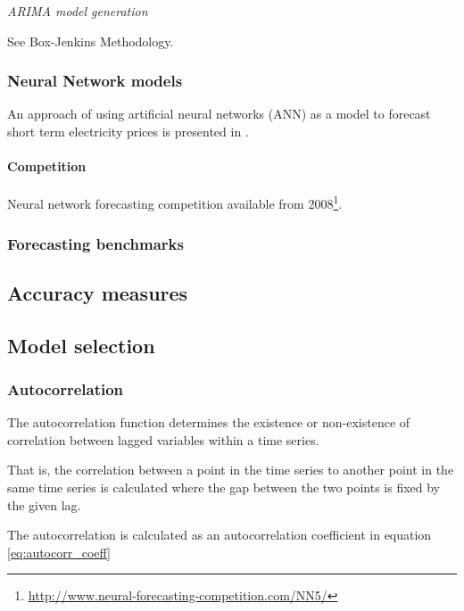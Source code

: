 \emph{ARIMA model generation}

See Box-Jenkins Methodology. 


\subsubsection{Neural Network models}

An approach of using artificial neural networks (ANN) as a model to forecast short term electricity prices is presented in \cite{szkuta1999electricity}. 


\paragraph{Competition}

Neural network forecasting competition available from 2008\footnote{\url{http://www.neural-forecasting-competition.com/NN5/}}. 




\subsubsection{Forecasting benchmarks}






\subsection{Accuracy measures}


\subsection{Model selection}



\subsubsection{Autocorrelation}



The autocorrelation function determines the existence or non-existence of correlation between lagged variables within a time series. 

That is, the correlation between a point in the time series to another point in the same time series is calculated where the gap between the two points is fixed by the given lag. 

The autocorrelation is calculated as an autocorrelation coefficient in equation \ref{eq:autocorr_coeff}

